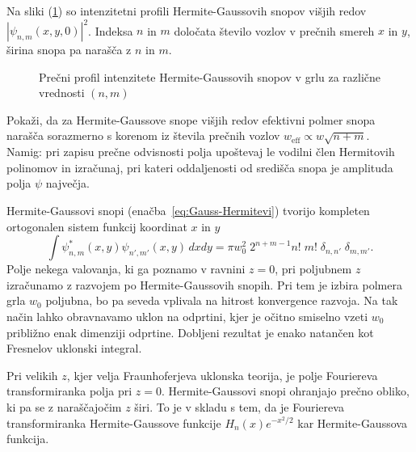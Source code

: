Na sliki (\ref{fig:Gauss-Hermitevi-snopi}) so intenzitetni profili 
Hermite-Gaussovih snopov višjih redov $|\psi_{n,m}(x, y, 0)|^2$.
Indeksa $n$ in $m$ določata število vozlov v prečnih smereh $x$ in $y$,
širina snopa pa narašča z $n$ in $m$. 

\begin{figure}[h]
\centering
\def\svgwidth{90truemm} 

\caption{Prečni profil intenzitete Hermite-Gaussovih snopov v grlu 
za različne vrednosti $(n,m)$}
\label{fig:Gauss-Hermitevi-snopi}
\end{figure}

\begin{definition}
\label{naloga:HG}
Pokaži, da za Hermite-Gaussove snope višjih redov efektivni polmer snopa 
narašča sorazmerno s korenom iz števila prečnih vozlov $ w_{\mathrm{eff}}\propto w\sqrt{n+m}$.\\
Namig: pri zapisu prečne odvisnosti polja upoštevaj le vodilni člen Hermitovih polinomov 
in izračunaj, pri kateri oddaljenosti od središča snopa je amplituda polja $\psi$ največja.
\end{definition}

\begin{remark}
 Hermite-Gaussovi snopi (enačba~\ref{eq:Gauss-Hermitevi}) tvorijo kompleten
ortogonalen sistem funkcij koordinat $x$ in $y$
\begin{equation}
\int\psi_{n,m}^{*}(x,y)\psi_{n',m'}(x,y)\, dx dy=\pi w_{0}^{2}\; 
2^{n+m-1}n!\;m!\; \delta_{n,n'}\;\delta_{m,m'}.
\end{equation}
Polje nekega valovanja, ki ga poznamo v ravnini $z=0$, pri
poljubnem $z$ izračunamo z razvojem po Hermite-Gaussovih snopih. Pri tem
je izbira polmera grla $w_{0}$ poljubna, bo pa seveda vplivala na
hitrost konvergence razvoja. Na tak način lahko obravnavamo uklon
na odprtini, kjer je očitno smiselno vzeti $w_{0}$ približno enak
dimenziji odprtine. Dobljeni rezultat je enako natančen kot Fresnelov
uklonski integral.

Pri velikih $z$, kjer velja Fraunhoferjeva uklonska teorija, je
polje Fouriereva transformiranka polja pri $z=0$. Hermite-Gaussovi
snopi ohranjajo prečno obliko, ki pa se z naraščajočim $z$ širi. 
To je v skladu s tem, da je Fouriereva transformiranka Hermite-Gaussove funkcije 
$H_{n}(x)e^{-x^{2}/2}$ kar Hermite-Gaussova funkcija.
\end{remark}

